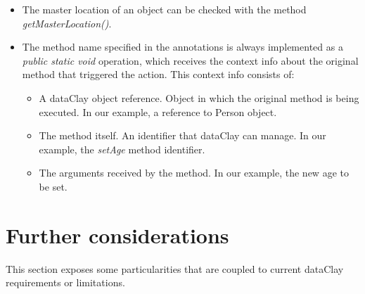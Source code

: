 \begin{itemize}
    \item The master location of an object can be checked with the method \textit{getMasterLocation()}.
    \item The method name specified in the annotations is always implemented as a \textit{public static void} operation, which receives the context info about the original method that triggered the action. This context info consists of:
 \begin{itemize}
    \item A dataClay object reference. Object in which the original method is being executed. In our example, a reference to Person object.
    \item The method itself. An identifier that dataClay can manage. In our example, the \textit{setAge} method identifier.
    \item The arguments received by the method. In our example, the new age to be set.
 \end{itemize}
\end{itemize}

\FEDERATION{

}

\section{Further considerations}
\label{sec:JavaConsiderations}

This section exposes some particularities that are coupled to current dataClay requirements or limitations.

